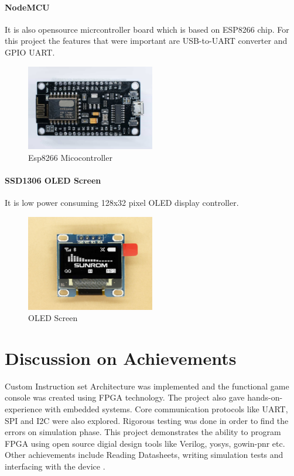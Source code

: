 \documentclass[a4paper,12pt]{article}
\begin{document}
    \paragraph{NodeMCU}
    It is also opensource micrcontroller board which is based on ESP8266 chip. For this project the features that were important are USB-to-UART converter and GPIO UART.
    \begin{figure}[H]
        \centering
        \includegraphics[width=0.5\textwidth ]{./images/nodemcu.jpg}
        \caption{Esp8266 Micocontroller}
    \end{figure}

    \paragraph{SSD1306 OLED Screen}
    It is low power consuming 128x32 pixel OLED display controller. 

    \begin{figure}[H]
        \centering
        \includegraphics[width=0.5\textwidth ]{./images/ssd1306.jpg}
        \caption{OLED Screen}
    \end{figure}
    \newpage
    \section{Discussion on Achievements}

    Custom Instruction set Architecture was implemented and the functional game console was created using FPGA technology. The project also gave hands-on-experience with embedded systems. Core communication protocols like UART, SPI and I2C were also explored. Rigorous testing was done in order to find the errors on simulation phase. This project demonstrates the ability to program FPGA using open source digial design tools like Verilog, yosys, gowin-pnr etc. Other achievements include Reading Datasheets, writing simulation tests and interfacing with the device . 
\end{document}
